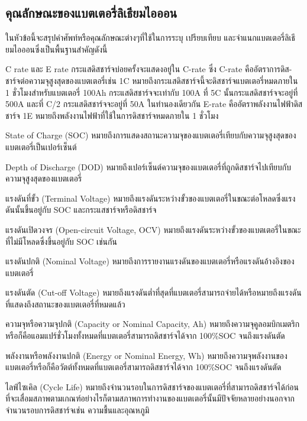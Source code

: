 \subsection{คุณลักษณะของแบตเตอรี่ลิเธียมไอออน}
ในหัวข้อนี้จะสรุปคำศัพท์หรือคุณลักษณะต่างๆที่ใช้ในการระบุ เปรียบเทียบ และจำแนกแบตเตอรี่ลิเธียมไอออนซึ่งเป็นพื้นฐานสำคัญดังนี้
\begin{itemize}
	{\item
		C rate และ E rate กระแสดิสชาร์จบ่อยครั้งจะแสดงอยู่ใน C-rate ซึ่ง C-rate คืออัตราการดิส-ชาร์จต่อความจุสูงสุดของแบตเตอรี่เช่น 1C      	  หมายถึงกระแสดิสชาร์จนี้จะดิสชาร์จแบตเตอรี่หมดภายใน 1 ชั่วโมงสำหรับแบตเตอรี่ 100Ah กระแสดิสชาร์จจะเท่ากับ 100A ที่ 5C นั้นกระแสดิสชาร์จจะอยู่ที่ 500A และที่ C/2 
		กระแสดิสชาร์จจะอยู่ที่ 50A ในทำนองเดียวกัน E-rate คืออัตราพลังงานไฟฟ้าดิสชาร์จ 1E หมายถึงพลังงานไฟฟ้าที่ใช้ในการดิสชาร์จหมดภายใน 1 ชั่วโมง}
	{\item
		State of Charge (SOC) หมายถึงการแสดงสถานะความจุของแบตเตอรี่เทียบกับความจุสูงสุดของแบตเตอรี่เป็นเปอร์เซ็นต์}
	{\item
		Depth of Discharge (DOD) หมายถึงเปอร์เซ็นต์ความจุของแบตเตอรี่ที่ถูกดิสชาร์จไปเทียบกับความจุสูงสุดของแบตเตอรี่}
	{\item
		แรงดันที่ขั้ว (Terminal Voltage) หมายถึงแรงดันระหว่างขั้วของแบตเตอรี่ในขณะต่อโหลดซึ่งแรงดันนั้นขึ้นอยู่กับ SOC และกระแสชาร์จหรือดิสชาร์จ}
	{\item
		แรงดันเปิดวงจร (Open-circuit Voltage, OCV) หมายถึงแรงดันระหว่างขั้วของแบตเตอรี่ในขณะที่ไม่มีโหลดซึ่งขึ้นอยู่กับ SOC เช่นกัน}
	{\item
		แรงดันปกติ (Nominal Voltage) หมายถึงการรายงานแรงดันของแบตเตอรี่หรือแรงดันอ้างอิงของแบตเตอรี่}
	{\item
		แรงดันตัด (Cut-off Voltage) หมายถึงแรงดันต่ำที่สุดที่แบตเตอรี่สามารถจ่ายได้หรือหมายถึงแรงดันที่แสดงถึงสถานะของแบตเตอรี่ที่หมดแล้ว}
	{\item
		ความจุหรือความจุปกติ (Capacity or Nominal Capacity, Ah) หมายถึงความจุคูลอมบิกเมตริกหรือก็คือแอมแปร์ชั่วโมงทั้งหมดที่แบตเตอรี่สามารถดิสชาร์จได้จาก 100\%SOC จนถึงแรงดันตัด}
	{\item
		พลังงานหรือพลังงานปกติ (Energy or Nominal Energy, Wh) หมายถึงความจุพลังงานของแบตเตอรี่หรือก็คือวัตต์ทั้งหมดที่แบตเตอรี่สามารถดิสชาร์จได้จาก 100\%SOC จนถึงแรงดันตัด}
	{\item
		ไลฟ์ไซเคิล (Cycle Life) หมายถึงจำนวนรอบในการดิสชาร์จของแบตเตอรี่ที่สามารถดิสชาร์จได้ก่อนที่จะเสื่อมสภาพตามเกณฑ์อย่างไรก็ตามสภาพการทำงานของแบตเตอรี่นั้นมีปัจจัยหลายอย่างนอกจากจำนวนรอบการดิสชาร์จเช่น ความชื้นและอุณหภูมิ}
	{\item
}
\end{itemize}
